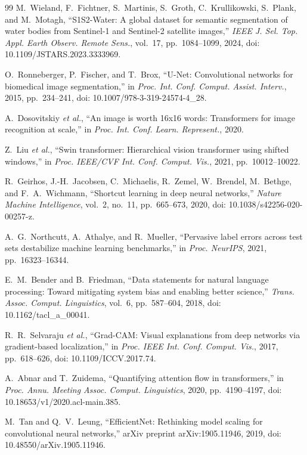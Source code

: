 \documentclass[11pt,journal]{IEEEtran}
\begin{document}
\begin{thebibliography}{99}
M.~Wieland, F.~Fichtner, S.~Martinis, S.~Groth, C.~Krullikowski, S.~Plank, and
M.~Motagh, ``S1S2-Water: A global dataset for semantic segmentation of water
bodies from Sentinel-1 and Sentinel-2 satellite images,'' \emph{IEEE J. Sel.
Top. Appl. Earth Observ. Remote Sens.}, vol.~17, pp.~1084--1099, 2024,
doi: 10.1109/JSTARS.2023.3333969.

O.~Ronneberger, P.~Fischer, and T.~Brox, ``U-Net: Convolutional networks for
biomedical image segmentation,'' in \emph{Proc. Int. Conf. Comput. Assist.
Interv.}, 2015, pp.~234--241, doi: 10.1007/978-3-319-24574-4\_28.

A.~Dosovitskiy \emph{et al.}, ``An image is worth 16x16 words: Transformers for
image recognition at scale,'' in \emph{Proc. Int. Conf. Learn. Represent.}, 2020.

Z.~Liu \emph{et al.}, ``Swin transformer: Hierarchical vision transformer using
shifted windows,'' in \emph{Proc. IEEE/CVF Int. Conf. Comput. Vis.}, 2021,
pp.~10012--10022.

R.~Geirhos, J.-H.~Jacobsen, C.~Michaelis, R.~Zemel, W.~Brendel, M.~Bethge, and
F.~A.~Wichmann, ``Shortcut learning in deep neural networks,'' \emph{Nature
Machine Intelligence}, vol.~2, no.~11, pp.~665--673, 2020,
doi: 10.1038/s42256-020-00257-z.

A.~G.~Northcutt, A.~Athalye, and R.~Mueller, ``Pervasive label errors across test
sets destabilize machine learning benchmarks,'' in \emph{Proc. NeurIPS}, 2021,
pp.~16323--16344.

E.~M.~Bender and B.~Friedman, ``Data statements for natural language processing:
Toward mitigating system bias and enabling better science,'' \emph{Trans. Assoc.
Comput. Linguistics}, vol.~6, pp.~587--604, 2018, doi: 10.1162/tacl\_a\_00041.

R.~R.~Selvaraju \emph{et al.}, ``Grad-CAM: Visual explanations from deep networks
via gradient-based localization,'' in \emph{Proc. IEEE Int. Conf. Comput. Vis.},
2017, pp.~618--626, doi: 10.1109/ICCV.2017.74.

A.~Abnar and T.~Zuidema, ``Quantifying attention flow in transformers,'' in
\emph{Proc. Annu. Meeting Assoc. Comput. Linguistics}, 2020, pp.~4190--4197,
doi: 10.18653/v1/2020.acl-main.385.

M.~Tan and Q.~V.~Leung, ``EfficientNet: Rethinking model scaling for
convolutional neural networks,'' arXiv preprint arXiv:1905.11946, 2019,
doi: 10.48550/arXiv.1905.11946.

\end{thebibliography}
\end{document}
